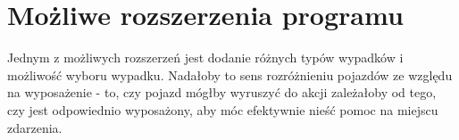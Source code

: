 \documentclass{article}
\begin{document}
\section{Możliwe rozszerzenia programu}
Jednym z możliwych rozszerzeń jest dodanie różnych typów wypadków i możliwość wyboru wypadku. Nadałoby to sens rozróżnieniu pojazdów ze względu na wyposażenie - to, czy pojazd mógłby wyruszyć do akcji zależałoby od tego, czy jest odpowiednio wyposażony, aby móc efektywnie nieść pomoc na miejscu zdarzenia.
\end{document}

